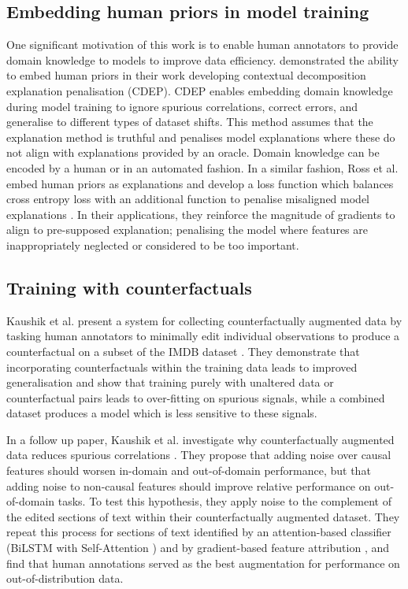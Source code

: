 \documentclass[sigconf,anonymous]{aamas}
\begin{document}
\subsection{Embedding human priors in model training}
One significant motivation of this work is to enable human annotators to provide domain knowledge to models to improve data efficiency. \citeauthor{rieger2020interpretations} \cite{rieger2020interpretations} demonstrated the ability to embed human priors in their work developing contextual decomposition explanation penalisation (CDEP). CDEP enables embedding domain knowledge during model training to ignore spurious correlations, correct errors, and generalise to different types of dataset shifts. This method assumes that the explanation method is truthful and penalises model explanations where these do not align with explanations provided by an oracle. Domain knowledge can be encoded by a human or in an automated fashion. In a similar fashion, Ross et al. embed human priors as explanations and develop a loss function which balances cross entropy loss with an additional function to penalise misaligned model explanations \cite{ross2017right}. In their applications, they reinforce the magnitude of gradients to align to pre-supposed explanation; penalising the model where features are inappropriately neglected or considered to be too important.

\subsection{Training with counterfactuals}
Kaushik et al. \cite{Kaushik2020Learning} present a system for collecting counterfactually augmented data by tasking human annotators to minimally edit individual observations to produce a counterfactual on a subset of the IMDB dataset \cite{imdb}. They demonstrate that incorporating counterfactuals within the training data leads to improved generalisation and show that training purely with unaltered data or counterfactual pairs leads to over-fitting on spurious signals, while a combined dataset produces a model which is less sensitive to these signals.

In a follow up paper, Kaushik et al. investigate why counterfactually augmented data reduces spurious correlations \cite{kaushik2021explaining}. They propose that adding noise over causal features should worsen in-domain and out-of-domain performance, but that adding noise to non-causal features should improve relative performance on out-of-domain tasks. To test this hypothesis, they apply noise to the complement of the edited sections of text within their counterfactually augmented dataset. They repeat this process for sections of text identified by an attention-based classifier (BiLSTM with Self-Attention \cite{graves2005framewise}) and by gradient-based feature attribution \cite{li2016visualizing}, and find that human annotations served as the best augmentation for performance on out-of-distribution data. 
\end{document}
